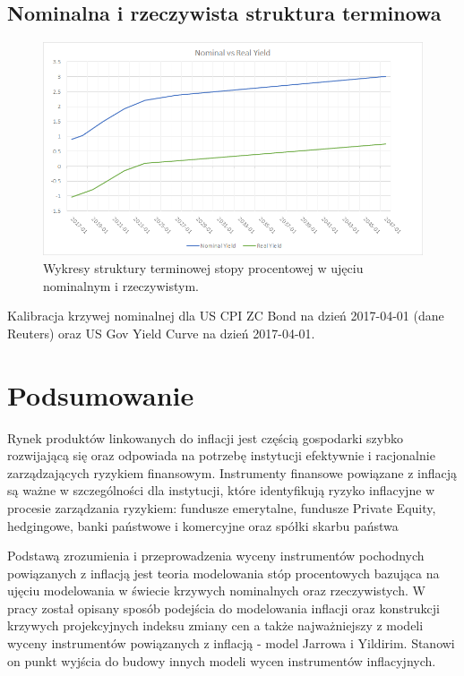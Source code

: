 \documentclass{mini}
\theoremstyle{mythstyle}
\begin{document}
	\section{Nominalna i rzeczywista struktura terminowa}
	
	\begin{figure} [h]
		\centering
		\includegraphics[scale=0.75]{graphics/realvsnominal.png}
		\caption{Wykresy struktury terminowej stopy procentowej w ujęciu nominalnym i rzeczywistym.}
	\end{figure}

	Kalibracja krzywej nominalnej dla US CPI ZC Bond na dzień 2017-04-01 (dane Reuters) oraz US Gov Yield Curve na dzień 2017-04-01.
	
\chapter*{Podsumowanie}

Rynek produktów linkowanych do inflacji jest częścią gospodarki szybko rozwijającą się oraz odpowiada na potrzebę instytucji efektywnie i racjonalnie zarządzających ryzykiem finansowym. Instrumenty finansowe powiązane z inflacją są ważne w szczególności dla instytucji, które identyfikują ryzyko inflacyjne w procesie zarządzania ryzykiem: fundusze emerytalne, fundusze Private Equity, hedgingowe, banki państwowe i komercyjne oraz spółki skarbu państwa

Podstawą zrozumienia i przeprowadzenia wyceny instrumentów pochodnych powiązanych z inflacją jest teoria modelowania stóp procentowych bazująca na ujęciu modelowania w świecie krzywych nominalnych oraz rzeczywistych. W pracy został opisany sposób podejścia do modelowania inflacji oraz konstrukcji krzywych projekcyjnych indeksu zmiany cen a także najważniejszy z modeli wyceny instrumentów powiązanych z inflacją - model Jarrowa i Yildirim. Stanowi on punkt wyjścia do budowy innych modeli wycen instrumentów inflacyjnych. 
\end{document}

